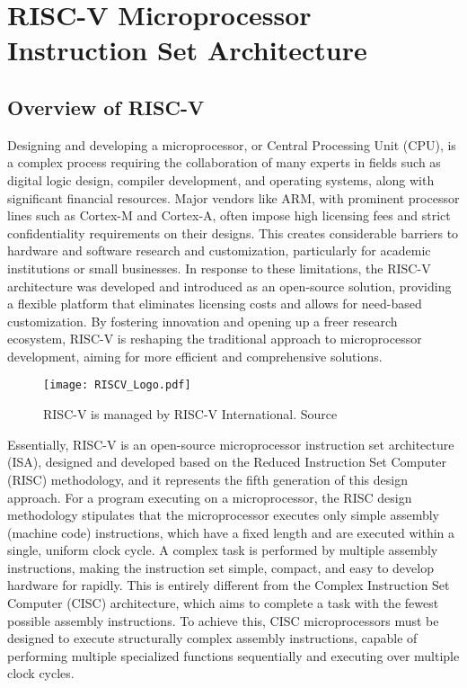 \chapter{RISC-V Microprocessor Instruction Set Architecture}

\section{Overview of RISC-V}

Designing and developing a microprocessor, or Central Processing Unit (CPU), is a complex process requiring the collaboration of many experts in fields such as digital logic design, compiler development, and operating systems, along with significant financial resources. Major vendors like ARM, with prominent processor lines such as Cortex-M and Cortex-A, often impose high licensing fees and strict confidentiality requirements on their designs. This creates considerable barriers to hardware and software research and customization, particularly for academic institutions or small businesses. In response to these limitations, the RISC-V architecture \cite{riscv:manual:user:2024, waterman2015riscvprivileged} was developed and introduced as an open-source solution, providing a flexible platform that eliminates licensing costs and allows for need-based customization. By fostering innovation and opening up a freer research ecosystem, RISC-V is reshaping the traditional approach to microprocessor development, aiming for more efficient and comprehensive solutions.

\begin{figure}[h!]
    \centering
    \texttt{[image: RISCV\_Logo.pdf]}
    \caption{RISC-V is managed by RISC-V International. Source \cite{riscv2024members}}
    \label{fig:riscv_international}
\end{figure}

Essentially, RISC-V is an open-source microprocessor instruction set architecture (ISA), designed and developed based on the Reduced Instruction Set Computer (RISC) methodology, and it represents the fifth generation of this design approach. For a program executing on a microprocessor, the RISC design methodology stipulates that the microprocessor executes only simple assembly (machine code) instructions, which have a fixed length and are executed within a single, uniform clock cycle. A complex task is performed by multiple assembly instructions, making the instruction set simple, compact, and easy to develop hardware for rapidly. This is entirely different from the Complex Instruction Set Computer (CISC) architecture, which aims to complete a task with the fewest possible assembly instructions. To achieve this, CISC microprocessors must be designed to execute structurally complex assembly instructions, capable of performing multiple specialized functions sequentially and executing over multiple clock cycles.

